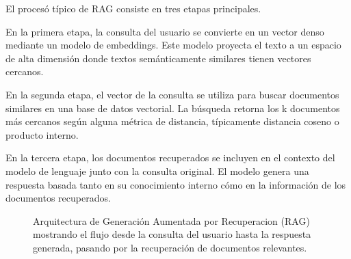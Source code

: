 \documentclass[12pt,a4paper,twoside]{book}
\begin{document}
El procesó típico de RAG consiste en tres etapas principales.

En la primera etapa, la consulta del usuario se convierte en un vector denso mediante un modelo de embeddings. Este modelo proyecta el texto a un espacio de alta dimensión donde textos semánticamente similares tienen vectores cercanos.

En la segunda etapa, el vector de la consulta se utiliza para buscar documentos similares en una base de datos vectorial. La búsqueda retorna los k documentos más cercanos según alguna métrica de distancia, típicamente distancia coseno o producto interno.

En la tercera etapa, los documentos recuperados se incluyen en el contexto del modelo de lenguaje junto con la consulta original. El modelo genera una respuesta basada tanto en su conocimiento interno cómo en la información de los documentos recuperados.

\begin{figure}[h]
\centering
{}
\caption{Arquitectura de Generación Aumentada por Recuperacion (RAG) mostrando el flujo desde la consulta del usuario hasta la respuesta generada, pasando por la recuperación de documentos relevantes.}
\label{fig:rag_architecture}
\end{figure}
\end{document}

